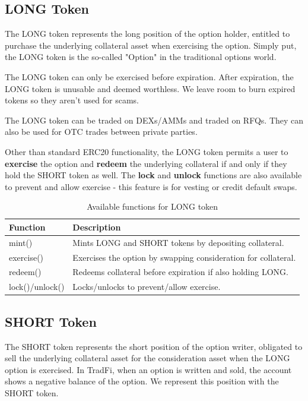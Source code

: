 \documentclass[%
 reprint,
 amsmath,amssymb,
 aps,
]{revtex4-2}
\begin{document}
\subsection{LONG Token}

The LONG token represents the long position of the option holder,
entitled to purchase the underlying collateral asset when exercising the option. 
Simply put, the LONG token is the so-called "Option" in the traditional options world.

The LONG token can only be exercised before expiration. After expiration, the LONG token 
is unusable and deemed worthless. We leave room to burn expired tokens so they aren't used for scams. 

The LONG token can be traded on DEXs/AMMs and traded on RFQs. 
They can also be used for OTC trades between private parties.

Other than standard ERC20 functionality, the LONG token permits a user to \textbf{exercise} the option and 
\textbf{redeem} the underlying collateral if and only if they hold the SHORT token as well. 
The \textbf{lock} and \textbf{unlock} functions are also available to prevent and allow exercise - this feature is for vesting or credit default swaps.

\begin{table}[h]
\centering
\begin{tabular}{|p{3cm}|p{4cm}|}
\hline
\textbf{Function} & \textbf{Description} \\
\hline
mint()  & Mints LONG and SHORT tokens by depositing collateral. \\
\hline
exercise() & Exercises the option by swapping consideration for collateral. \\
\hline
redeem() & Redeems collateral before expiration if also holding LONG. \\
\hline
lock()/unlock() & Locks/unlocks to prevent/allow exercise. \\
\hline
\end{tabular}
\caption{Available functions for LONG token}
\label{tab:functions}
\end{table}


\subsection{SHORT Token}

The SHORT token represents the short position of the option writer,
obligated to sell the underlying collateral asset for the consideration
asset when the LONG option is exercised. 
In TradFi, when an option is written and sold, the account shows a negative balance of the option. 
We represent this position with the SHORT token. 
\end{document}
